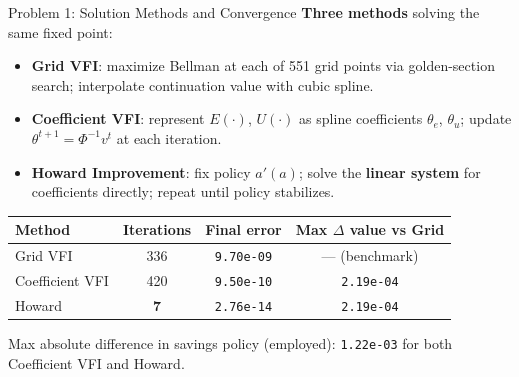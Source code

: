 \documentclass[aspectratio=169,11pt]{beamer}
\begin{document}
\begin{frame}{Problem 1: Solution Methods and Convergence}
    \textbf{Three methods} solving the same fixed point:

    \begin{itemize}\setlength\itemsep{0.2em}
        \item \textbf{Grid VFI}: maximize Bellman at each of 551 grid points via golden-section search; interpolate continuation value with cubic spline.
        \item \textbf{Coefficient VFI}: represent $E(\cdot)$, $U(\cdot)$ as spline coefficients $\theta_e$, $\theta_u$; update $\theta^{t+1} = \Phi^{-1} v^t$ at each iteration.
        \item \textbf{Howard Improvement}: fix policy $a'(a)$; solve the \textbf{linear system} for coefficients directly; repeat until policy stabilizes.
    \end{itemize}

    \vspace{0.4em}
    \begin{center}
    \small
    \renewcommand{\arraystretch}{1.15}
    \begin{tabular}{lccc}
        \toprule
        \textbf{Method} & \textbf{Iterations} & \textbf{Final error} & \textbf{Max $\Delta$ value vs Grid} \\
        \midrule
        Grid VFI & 336 & \texttt{9.70e-09} & --- (benchmark) \\
        Coefficient VFI & 420 & \texttt{9.50e-10} & \texttt{2.19e-04} \\
        Howard & \textbf{7} & \texttt{2.76e-14} & \texttt{2.19e-04} \\
        \bottomrule
    \end{tabular}
    \end{center}
    \vspace{0.2em}
    \footnotesize
    Max absolute difference in savings policy (employed): \texttt{1.22e-03} for both Coefficient VFI and Howard.
\end{frame}
\end{document}
